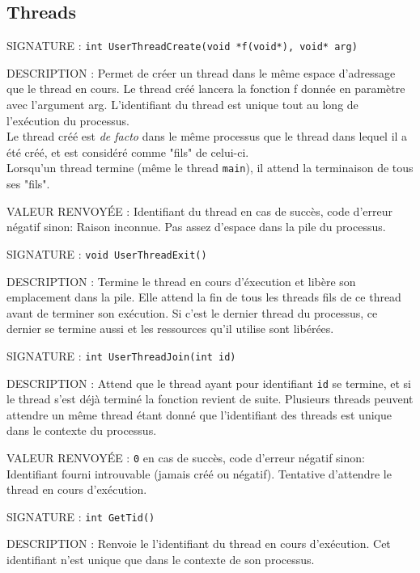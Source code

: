 \documentclass{article}
\begin{document}
	\subsection{Threads}
		\begin{description}
			\item{SIGNATURE : } \texttt{int UserThreadCreate(void *f(void*), void* arg)}
			\item{DESCRIPTION : } Permet de créer un thread dans le même espace d'adressage que le thread en cours. Le thread créé lancera la fonction f donnée en paramètre avec l'argument arg. L'identifiant du thread est unique tout au long de l'exécution du processus. \\
			Le thread créé est \emph{de facto} dans le même processus que le thread dans lequel il a été créé, et est considéré comme "fils" de celui-ci. \\
			Lorsqu'un thread termine (même le thread \texttt{main}), il attend la terminaison de tous ses "fils".
			\item{VALEUR RENVOYÉE : } Identifiant du thread en cas de succès, code d'erreur négatif sinon:
				 Raison inconnue.
				 Pas assez d'espace dans la pile du processus.
		\end{description}
		\vspace{2.5mm}
		\begin{description}
			\item{SIGNATURE : } \texttt{void UserThreadExit()}
			\item{DESCRIPTION : } Termine le thread en cours d'éxecution et libère son emplacement dans la pile. Elle attend la fin de tous les threads fils de ce thread avant de terminer son exécution. Si c'est le dernier thread du processus, ce dernier se termine aussi et les ressources qu'il utilise sont libérées.
		\end{description}
		\vspace{2.5mm}
		\begin{description}
			\item{SIGNATURE : } \texttt{int UserThreadJoin(int id)}
			\item{DESCRIPTION : } Attend que le thread ayant pour identifiant \texttt{id} se termine, et si le thread s'est déjà terminé la fonction revient de suite. Plusieurs threads peuvent attendre un même thread étant donné que l'identifiant des threads est unique dans le contexte du processus.
			\item{VALEUR RENVOYÉE : } \texttt{0} en cas de succès, code d'erreur négatif sinon:
				 Identifiant fourni introuvable (jamais créé ou négatif).
				 Tentative d'attendre le thread en cours d'exécution.
		\end{description}
		\vspace{2.5mm}
		\begin{description}
			\item{SIGNATURE : } \texttt{int GetTid()}
			\item{DESCRIPTION : Renvoie le l'identifiant du thread en cours d'exécution. Cet identifiant n'est unique que dans le contexte de son processus.} 
		\end{description}
\end{document}

